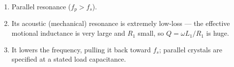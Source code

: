 \begin{enumerate}[leftmargin=1.6em,itemsep=2pt]
\item Parallel resonance ($f_p > f_s$).
\item Its acoustic (mechanical) resonance is extremely low-loss --- the effective motional inductance is very large and $R_1$ small, so $Q = \omega L_1/R_1$ is huge.
\item It lowers the frequency, pulling it back toward $f_s$; parallel crystals are specified at a stated load capacitance.
\end{enumerate}
